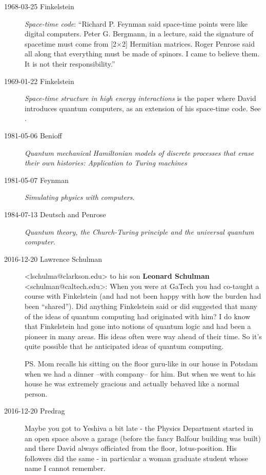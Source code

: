 \begin{description}

\item[1968-03-25 Finkelstein] {\em Space-time code}:
``Richard P. Feynman said space-time points were like digital computers. Peter G.
Bergmann, in a lecture, said the signature of spacetime must come from
[2$\times$2] Hermitian matrices. Roger Penrose said all along that everything
must be made of spinors. I came to believe them. It is not their
responsibility.''

\item[1969-01-22 Finkelstein]
{\em Space-time structure in high energy interactions}
is the paper where David introduces quantum computers, as an extension of
his {space-time code}. See .

\item[1981-05-06 Benioff]
 {\em Quantum mechanical {Hamiltonian} models of discrete processes that erase
 their own histories: {Application to Turing} machines}

\item[1981-05-07 Feynman]
{\em Simulating physics with computers}.

\item[1984-07-13 Deutsch and Penrose]
{\em Quantum theory, the {Church-Turing} principle and the universal quantum
computer}.



\item[2016-12-20 Lawrence Schulman]  <lschulma@clarkson.edu> to his son
{\bf Leonard Schulman} <schulman@caltech.edu>:
When you were at GaTech you had
co-taught a course with Finkelstein (and had not been happy
with how the burden had been ``shared'').
Did anything Finkelstein said or did suggested that many of the
ideas of quantum computing had originated with him? I do know that Finkelstein
had gone into notions of quantum logic and had been a pioneer in many
areas. His ideas
often were way ahead of their time. So it's quite possible that he anticipated
ideas of quantum computing.

PS. Mom recalls his sitting on the floor guru-like in our house in Potsdam when
we had a dinner --with company-- for him. But when we went to his house he was
extremely gracious and actually behaved like a normal person.

\item[2016-12-20 Predrag]
Maybe you got to Yeshiva a bit late - the Physics Department started in an open
space above a garage (before the fancy Balfour building was built) and there
David always officiated from the floor, lotus-position. His followers did the
same - in particular a woman graduate student whose name I cannot remember.


\end{description}
